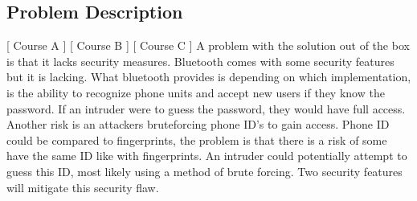 \subsection{Problem Description}
[ Course A ] [ Course B ] [ Course C ] 
\newline
A problem with the solution out of the box is that it lacks security measures. Bluetooth comes with some security features but it is lacking. What bluetooth provides is depending on which implementation, is the ability to recognize phone units and accept new users if they know the password. If an intruder were to guess the password, they would have full access. Another risk is an attackers bruteforcing phone ID's to gain access. Phone ID  could be compared to fingerprints, the problem is that there is a risk of some have the same ID like with fingerprints. An intruder could potentially attempt to guess this ID, most likely using a method of brute forcing. Two security features will mitigate this security flaw.